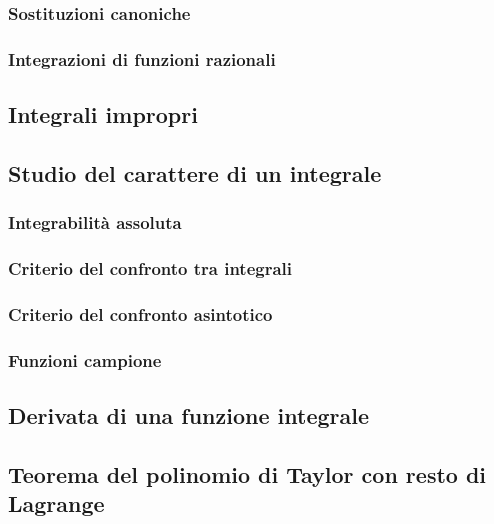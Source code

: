 \documentclass[a4paper]{article}
\begin{document}
\subsubsection*{Sostituzioni canoniche}
\subsubsection*{Integrazioni di funzioni razionali}
\subsection{Integrali impropri}
\subsection{Studio del carattere di un integrale}
\subsubsection*{Integrabilità assoluta}
\subsubsection*{Criterio del confronto tra integrali}
\subsubsection*{Criterio del confronto asintotico}
\subsubsection*{Funzioni campione}
\subsection{Derivata di una funzione integrale}

\subsection{Teorema del polinomio di Taylor con resto di Lagrange}
\end{document}
